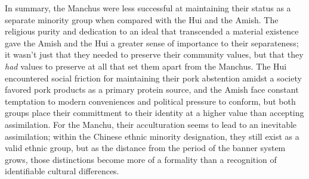In summary, the Manchus were less successful at maintaining their status as a
separate minority group when compared with the  Hui and the Amish. The
religious purity and dedication to an ideal that transcended a material
existence gave the Amish and the Hui a greater sense of importance to their
separateness; it wasn't just that they needed to preserve their community
values, but that they \textit{had} values to preserve at all that set them
apart from the Manchus. The Hui encountered social friction for maintaining
their pork abstention amidst a society favored pork products as a primary
protein source, and the Amish face constant temptation to modern conveniences
and political pressure to conform, but both groups place their committment to
their identity at a higher value than accepting assimilation.  For the Manchu, their acculturation seems to lead to an inevitable assimilation; within the Chinese ethnic minority designation, they still exist as a valid ethnic group, but as the distance from the period of the banner system grows, those distinctions become more of a formality than a recognition of identifiable cultural differences.
